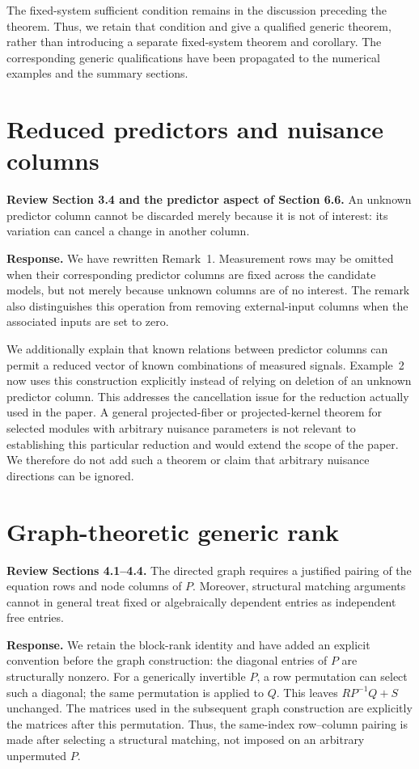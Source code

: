 \documentclass[11pt]{article}
\begin{document}
The fixed-system sufficient condition remains in the discussion preceding the
theorem. Thus, we retain that condition and give a qualified generic theorem,
rather than introducing a separate fixed-system theorem and corollary.
The corresponding generic qualifications have been propagated to the numerical
examples and the summary sections.

\section{Reduced predictors and nuisance columns}
\textbf{Review Section 3.4 and the predictor aspect of Section 6.6.}
An unknown predictor column cannot be discarded merely because it is not of
interest: its variation can cancel a change in another column.

\textbf{Response.}
We have rewritten Remark~1. Measurement rows may be omitted when their
corresponding predictor columns are fixed across the candidate models, but not
merely because unknown columns are of no interest. The remark also distinguishes
this operation from removing external-input columns when the associated inputs
are set to zero.

We additionally explain that known relations between predictor columns can
permit a reduced vector of known combinations of measured signals.
Example~2 now uses this construction explicitly instead of relying on deletion
of an unknown predictor column. This addresses the cancellation issue for the
reduction actually used in the paper. A general projected-fiber or
projected-kernel theorem for selected modules with arbitrary nuisance parameters
is not relevant to establishing this particular reduction and would extend the
scope of the paper. We therefore do not add such a theorem or claim that
arbitrary nuisance directions can be ignored.

\section{Graph-theoretic generic rank}
\textbf{Review Sections 4.1--4.4.}
The directed graph requires a justified pairing of the equation rows and node
columns of $P$. Moreover, structural matching arguments cannot in general treat
fixed or algebraically dependent entries as independent free entries.

\textbf{Response.}
We retain the block-rank identity and have added an explicit convention before
the graph construction: the diagonal entries of $P$ are structurally nonzero.
For a generically invertible $P$, a row permutation can select such a diagonal;
the same permutation is applied to $Q$. This leaves $RP^{-1}Q+S$ unchanged.
The matrices used in the subsequent graph construction are explicitly the
matrices after this permutation. Thus, the same-index row--column pairing is
made after selecting a structural matching, not imposed on an arbitrary
unpermuted $P$.
\end{document}
